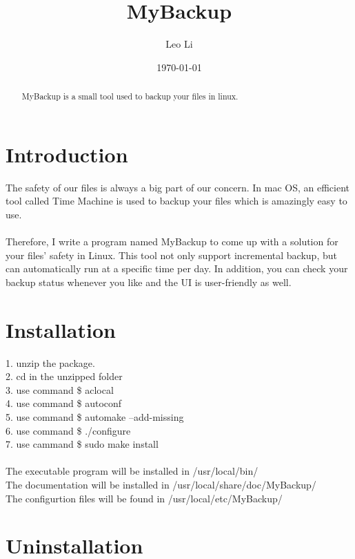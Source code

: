 \documentclass[a4paper]{article}
\title{\textbf{MyBackup}}
\author{Leo Li}
\date{\today}
\begin{document}
\maketitle

\begin{abstract}
MyBackup is a small tool used to backup your files in linux.
\end{abstract}

\section{Introduction}

The safety of our files is always a big part of our concern. In mac OS, an efficient tool called Time Machine is used to backup your files which is amazingly easy to use.\\\\
        Therefore, I write a program named MyBackup to come up with a solution for your files' safety in Linux. This tool not only support incremental backup, but can automatically run at a specific time per day. In addition, you can check your backup status whenever you like and the UI is user-friendly as well.

        \section{Installation}

        1. unzip the package. \\
            2. cd in the unzipped folder \\
            3. use command \$ aclocal \\
            4. use command \$ autoconf \\
            5. use command \$ automake --add-missing \\
            6. use command \$ ./configure \\
            7. use cammand \$ sudo make install \\\\
            The executable program will be installed in /usr/local/bin/ \\
            The documentation will be installed in /usr/local/share/doc/MyBackup/ \\
            The configurtion files will be found in /usr/local/etc/MyBackup/

            \section{Uninstallation}
\end{document}
